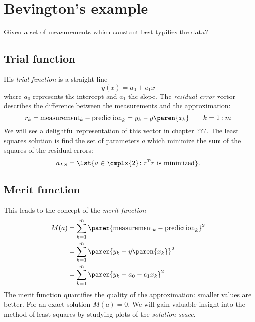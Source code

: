 \section{\label{sec:bevington example}Bevington's example}

Given a set of measurements which constant best typifies the data?

\subsection{Trial function}
His \emph{trial function} is a straight line
  \begin{equation}
    y(x) = a_{0} + a_{1} x
  \end{equation}
where $a_{0}$ represents the intercept and $a_{1}$ the slope. The \emph{residual error} vector describes the difference between the measurements and the approximation:
  \begin{equation}
    r_{k} = \text{measurement}_{k} - \text{prediction}_{k} = y_{k} - y\paren{x_{k}} \qquad k=1:m
  \end{equation}
We will see a delightful representation of this vector in chapter ???. The least squares solution is find the set of parameters $a$ which minimize the sum of the squares of the residual errors:
  \begin{equation}
    a_{LS} = \lst{a\in\cmplx{2}\colon r^{\mathrm{T}}r \text{ is minimized}} .
  \end{equation}
  
\subsection{Merit function}
This leads to the concept of the \emph{merit function}
  \begin{equation}
  \begin{split}
    M(a) 
      &= \sum_{k=1}^{m} \paren{\text{measurement}_{k} - \text{prediction}_{k}}^{2} \\
      &= \sum_{k=1}^{m} \paren{y_{k} - y\paren{x_{k}}}^{2} \\
      &= \sum_{k=1}^{m} \paren{y_{k} - a_{0} - a_{1} x_{k}}^{2}
    \label{eqn:merit}
  \end{split}
  \end{equation}
The merit function quantifies the quality of the approximation: smaller values are better. For an exact solution $M(a)=0$. We will gain valuable insight into the method of least squares by studying plots of the \emph{solution space}.


